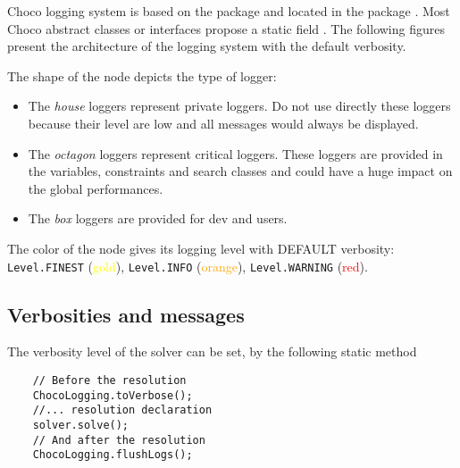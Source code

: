 Choco logging system is based on the  package and located in the package .
Most Choco abstract classes or interfaces propose a static field .
The following figures present the architecture of the logging system with the default verbosity.


The shape of the node depicts the type of logger:
\begin{itemize}
	\item The \emph{house} loggers represent private loggers. Do not use directly these loggers because their level are low and all messages would always be displayed.
	\item The \emph{octagon} loggers represent critical loggers. These loggers are provided in the variables, constraints and search classes and could have a huge impact on the global performances.
	\item The \emph{box} loggers are provided for dev and users.
\end{itemize}
The color of the node gives its logging level with DEFAULT verbosity:
\texttt{Level.FINEST} (\textcolor{yellow}{gold}),
\texttt{Level.INFO} (\textcolor{orange}{orange}),
\texttt{Level.WARNING} (\textcolor{red}{red}).

\subsection{Verbosities and messages}\label{solver:verbosityandmessages}\hypertarget{solver:verbosityandmessages}{}

The verbosity level of the solver can be set, by the following static method

\begin{lstlisting}
	// Before the resolution
	ChocoLogging.toVerbose();
	//... resolution declaration
	solver.solve();
	// And after the resolution
	ChocoLogging.flushLogs();
\end{lstlisting}


